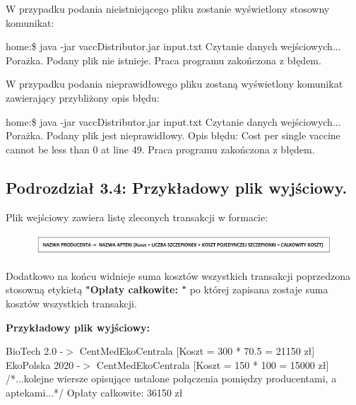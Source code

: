 \documentclass[a4paper]{article}
\begin{document}
W przypadku podania nieistniejącego pliku zostanie wyświetlony stosowny komunikat:
\begin{tcolorbox}
home:\$	java -jar vaccDistributor.jar input.txt
\newline Czytanie danych wejściowych... Porażka. Podany plik nie istnieje.
\newline 
\newline Praca programu zakończona z błędem.
\end{tcolorbox}

W przypadku podania nieprawidłowego pliku zostaną wyświetlony komunikat zawierający przybliżony opis błędu:
\begin{tcolorbox}
home:\$	java -jar vaccDistributor.jar input.txt
\newline Czytanie danych wejściowych... Porażka. Podany plik jest nieprawidłowy.
\newline Opis błędu: Cost per single vaccine cannot be less than 0 at line 49.
\newline 
\newline Praca programu zakończona z błędem.
\end{tcolorbox}


\newpage
\subsection*{Podrozdział 3.4: Przykładowy plik wyjściowy.}
Plik wejściowy zawiera listę zleconych transakcji w formacie:
\begin{figure}[H]
    \includegraphics[width=14cm]{Output1.png}
    \centering
\end{figure}
Dodatkowo na końcu widnieje suma kosztów wszystkich transakcji poprzedzona stosowną etykietą \textbf{"Opłaty całkowite: "} po której zapisana zostaje suma kosztów wszystkich transakcji.\newline

\textbf{Przykładowy plik wyjściowy:}
\begin{tcolorbox}
BioTech 2.0 -$>$ CentMedEkoCentrala [Koszt = 300 * 70.5 = 21150 zł]
\newline EkoPolska 2020 -$>$ CentMedEkoCentrala [Koszt = 150 * 100 = 15000 zł]
\newline 
\newline /*...kolejne wiersze opisujące ustalone połączenia pomiędzy producentami, a aptekami...*/
\newline 
\newline Opłaty całkowite: 36150 zł
\end{tcolorbox}
\end{document}
